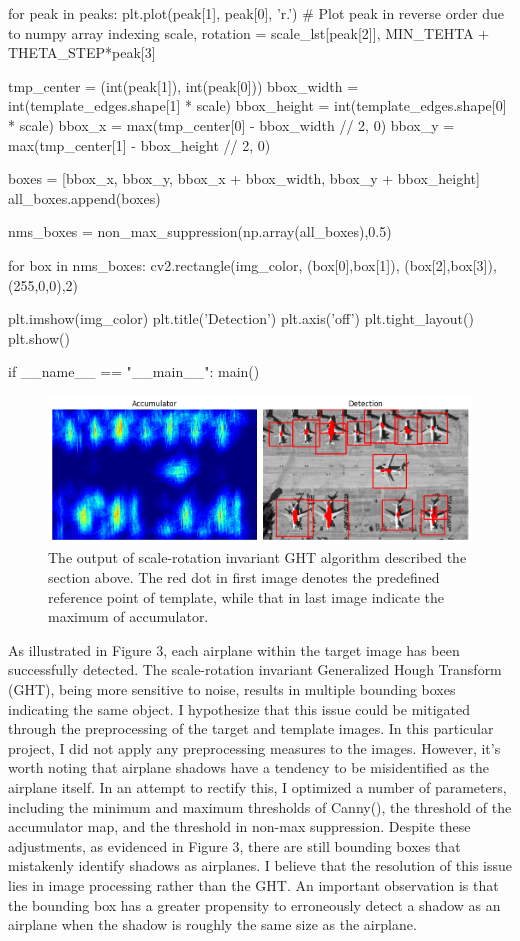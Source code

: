 \documentclass[10pt]{article}
\begin{document}
\begin{python}
    for peak in peaks:
        plt.plot(peak[1], peak[0], 'r.')  # Plot peak in reverse order due to numpy array indexing
        scale, rotation = scale_lst[peak[2]], MIN_TEHTA + THETA_STEP*peak[3]

        tmp_center = (int(peak[1]), int(peak[0]))
        bbox_width = int(template_edges.shape[1] * scale)
        bbox_height = int(template_edges.shape[0] * scale)
        bbox_x = max(tmp_center[0] - bbox_width // 2, 0)
        bbox_y = max(tmp_center[1] - bbox_height // 2, 0)

        boxes = [bbox_x, bbox_y, bbox_x + bbox_width, bbox_y + bbox_height]
        all_boxes.append(boxes)
        
    nms_boxes = non_max_suppression(np.array(all_boxes),0.5)

    for box in nms_boxes:
        cv2.rectangle(img_color, (box[0],box[1]), (box[2],box[3]), (255,0,0),2)
        
    plt.imshow(img_color)
    plt.title('Detection')
    plt.axis('off')
    plt.tight_layout()
    plt.show()

if __name__ == "__main__":
    main()
\end{python}
\begin{figure}[!h]
    \begin{center}
        \includegraphics*[scale = 0.5]{../hw2/fig3.png}
    \end{center}
    \caption{The output of scale-rotation invariant GHT algorithm described the section above. The red dot in first image denotes the predefined reference point of template, while that in last image indicate the maximum of accumulator. }
\end{figure}
As illustrated in Figure 3, each airplane within the target image has been successfully detected. The scale-rotation invariant Generalized Hough Transform (GHT), being more sensitive to noise, results in multiple bounding boxes indicating the same object. I hypothesize that this issue could be mitigated through the preprocessing of the target and template images. In this particular project, I did not apply any preprocessing measures to the images. However, it's worth noting that airplane shadows have a tendency to be misidentified as the airplane itself. 
In an attempt to rectify this, I optimized a number of parameters, including the minimum and maximum thresholds of Canny(), the threshold of the accumulator map, and the threshold in non-max suppression. Despite these adjustments, as evidenced in Figure 3, there are still bounding boxes that mistakenly identify shadows as airplanes. I believe that the resolution of this issue lies in image processing rather than the GHT.
An important observation is that the bounding box has a greater propensity to erroneously detect a shadow as an airplane when the shadow is roughly the same size as the airplane. 
\end{document}
